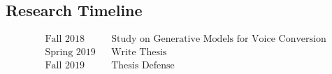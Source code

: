 \documentclass{article}
\begin{document}
%
%

\subsection{Research Timeline}
\begin{align*}
&\text{Fall 2018} && \text{Study on Generative Models for Voice Conversion} \\
&\text{Spring 2019} && \text{Write Thesis} \\
&\text{Fall 2019} && \text{Thesis Defense}
\end{align*}
\end{document}

